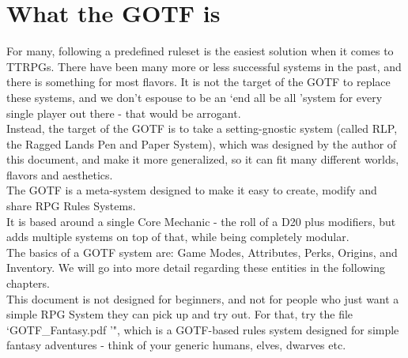 \section{What the GOTF is}\label{sec:gotfexplanation}
For many, following a predefined ruleset is the easiest solution when it comes to TTRPGs.
There have been many more or less successful systems in the past, and there is something for most flavors.
It is not the target of the GOTF to replace these systems, and we don't espouse to be an \lq end all be all \rq system for every single player out there - that would be arrogant.\\
Instead, the target of the GOTF is to take a setting-gnostic system (called RLP, the Ragged Lands Pen and Paper System), which was designed by the author of this document, and make it more generalized, so it can fit many different worlds, flavors and aesthetics.\\
The GOTF is a meta-system designed to make it easy to create, modify and share RPG Rules Systems.\\
It is based around a single Core Mechanic - the roll of a D20 plus modifiers, but adds multiple systems on top of that, while being completely modular.\\
The basics of a GOTF system are: Game Modes, Attributes, Perks, Origins, and Inventory.
We will go into more detail regarding these entities in the following chapters.\\
This document is not designed for beginners, and not for people who just want a simple RPG System they can pick up and try out.
For that, try the file \lq GOTF\_Fantasy.pdf \rq", which is a GOTF-based rules system designed for simple fantasy adventures - think of your generic humans, elves, dwarves etc.